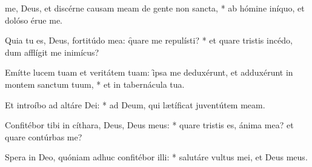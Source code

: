 \begin{psalmus}

 me, Deus, et discérne causam meam de gente non sancta, * ab hómine iníquo, et dolóso érue me.

Quia tu es, Deus, fortitúdo mea: \f quare me repulísti? * et quare tristis incédo, dum afflígit me inimícus?

Emítte lucem tuam et veritátem tuam: \f ipsa me deduxérunt, et adduxérunt in montem sanctum tuum, * et in tabernácula tua.

Et introíbo ad altáre Dei: * ad Deum, qui lætíficat juventútem meam.

Confitébor tibi in cíthara, Deus, Deus meus: * quare tristis es, ánima mea? et quare contúrbas me?

Spera in Deo, quóniam adhuc confitébor illi: * salutáre vultus mei, et Deus meus.

\end{psalmus}
